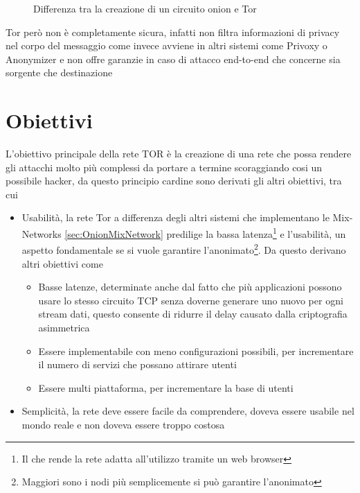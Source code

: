 \begin{figure}[htpb!]
    \centering
    
    \caption{Differenza tra la creazione di un circuito onion e Tor}
    \label{fig:telescopic}
\end{figure}

Tor però non è completamente sicura, infatti non filtra informazioni di privacy nel corpo del messaggio come invece avviene in altri sistemi come Privoxy o Anonymizer e non offre garanzie in caso di attacco end-to-end che concerne sia sorgente che destinazione
\cite{onionv2}

\section{Obiettivi}
L'obiettivo principale della rete TOR è la creazione di una rete che possa rendere gli attacchi molto più complessi da portare a termine scoraggiando cosi un possibile hacker, da questo principio cardine sono derivati gli altri obiettivi, tra cui
\begin{itemize}
    \item Usabilità, la rete Tor a differenza degli altri sistemi che implementano le Mix-Networks \ref{sec:OnionMixNetwork} predilige la bassa latenza\footnote{Il che rende la rete adatta all'utilizzo tramite un web browser} e l'usabilità, un aspetto fondamentale se si vuole garantire l'anonimato\footnote{Maggiori sono i nodi più semplicemente si può garantire l'anonimato}.
    Da questo derivano altri obiettivi come
    \begin{itemize}
        \item Basse latenze, determinate anche dal fatto che più applicazioni possono usare lo stesso circuito TCP senza doverne generare uno nuovo per ogni stream dati, questo consente di ridurre il delay causato dalla criptografia asimmetrica
        \item Essere implementabile con meno configurazioni possibili, per incrementare il numero di servizi che possano attirare utenti
        \item Essere multi piattaforma, per incrementare la base di utenti
    \end{itemize}
    \item Semplicità, la rete deve essere facile da comprendere, doveva essere usabile nel mondo reale e non doveva essere troppo costosa
\end{itemize}
\cite{ChaumMixes}

\newpage


